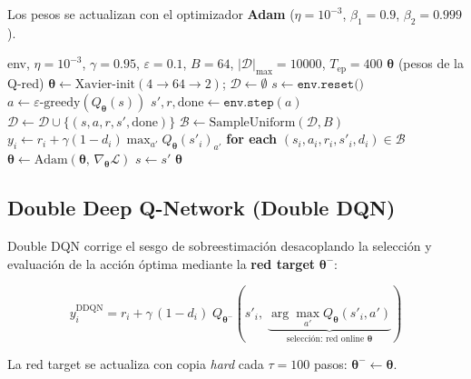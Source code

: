 Los pesos se actualizan con el optimizador \textbf{Adam} \cite{Kingma2015} ($\eta = 10^{-3}$, $\beta_1 = 0.9$, $\beta_2 = 0.999$).

\begin{algorithm}
\caption{Deep Q-Network (DQN)}\label{algo:dqn}
\begin{algorithmic}[1]
\Require env, $\eta{=}10^{-3}$, $\gamma{=}0.95$, $\varepsilon{=}0.1$, $B{=}64$, $|\mathcal{D}|_{\max}{=}10000$, $T_{\text{ep}}{=}400$
\Ensure $\boldsymbol{\theta}$ (pesos de la Q-red)
\State $\boldsymbol{\theta} \gets \text{Xavier-init}(4{\to}64{\to}2)$;\; $\mathcal{D} \gets \emptyset$
  \State $s \gets \texttt{env.reset()}$
    \State $a \gets \varepsilon\text{-greedy}(Q_{\boldsymbol{\theta}}(s))$
    \State $s', r, \text{done} \gets \texttt{env.step}(a)$
    \State $\mathcal{D} \gets \mathcal{D} \cup \{(s, a, r, s', \text{done})\}$
      \State $\mathcal{B} \gets \text{SampleUniform}(\mathcal{D}, B)$
      \State $y_i \gets r_i + \gamma(1{-}d_i)\max_{a'} Q_{\boldsymbol{\theta}}(s'_i)_{a'}$ \textbf{for each} $(s_i,a_i,r_i,s'_i,d_i) \in \mathcal{B}$
      \State $\boldsymbol{\theta} \gets \text{Adam}(\boldsymbol{\theta},\,\nabla_{\boldsymbol{\theta}}\mathcal{L})$
    \EndIf
    \State $s \gets s'$
  \EndWhile
\EndFor
\State \Return $\boldsymbol{\theta}$
\end{algorithmic}
\end{algorithm}

\subsection{Double Deep Q-Network (Double DQN)}

Double DQN \cite{vanHasselt2016} corrige el sesgo de sobreestimación desacoplando la selección y evaluación de la acción óptima mediante la \textbf{red target} $\boldsymbol{\theta}^-$:

\begin{equation}
  y_i^{\text{DDQN}} = r_i + \gamma\,(1-d_i)\; Q_{\boldsymbol{\theta}^-}\!\!\left(s'_i,\; \underbrace{\arg\max_{a'} Q_{\boldsymbol{\theta}}(s'_i, a')}_{\text{selección: red online } \boldsymbol{\theta}}\right)
\end{equation}

La red target se actualiza con copia \textit{hard} cada $\tau = 100$ pasos: $\boldsymbol{\theta}^- \leftarrow \boldsymbol{\theta}$.

